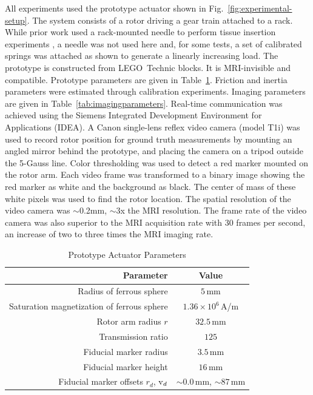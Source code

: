 \documentclass[journal]{IEEEtran}
\begin{document}
All experiments used the prototype actuator shown in Fig.\ \ref{fig:experimental-setup}. The system consists of a rotor driving a gear train attached to a rack. While prior work used a rack-mounted needle to perform tissue insertion experiments \cite{bergeles2012tracking}, a needle was not used here and, for some tests, a set of calibrated springs was attached as shown to generate a linearly increasing load. The prototype is constructed from LEGO\texttrademark~Technic blocks. It is MRI-invisible and compatible. Prototype parameters are given in Table\ \ref{tab:parameters}. 
Friction and inertia parameters were estimated through calibration experiments.
Imaging parameters are given in Table\ \ref{tab:imagingparameters}. 
Real-time communication was achieved using the Siemens Integrated Development Environment for Applications (IDEA). A Canon single-lens reflex video camera (model T1i) was used to record rotor position for ground truth measurements by mounting an angled mirror behind the prototype, and placing the camera on a tripod outside the 5-Gauss line. Color thresholding was used to detect a red marker mounted on the rotor arm. Each video frame was transformed to a binary image showing the red marker as white and the background as black.  The center of mass of these white pixels was used to find the rotor location. The spatial resolution of the video camera was $\sim$0.2mm, $\sim$3x the MRI resolution. The frame rate of the video camera was also superior to the MRI acquisition rate with 30 frames per second, an increase of two to three times the MRI imaging rate.

\begin{table}[b]
\vspace{-10pt}
\centering
\scriptsize
\caption{Prototype Actuator Parameters}
\label{tab:parameters}
\begin{tabular}{r | c}
	\textbf{Parameter}  & \textbf{Value} \\
	\hline
	Radius of ferrous sphere & $5\,$mm \\
	Saturation magnetization of ferrous sphere & $1.36\times10^6\,$A/m \\
	Rotor arm radius $r$& $32.5\,$mm \\
	Transmission ratio & $125$ \\
	Fiducial marker radius & $3.5\,$mm \\
	Fiducial marker height & $16\,$mm \\
	Fiducial marker offsets $r_d$, $\textnormal{v}_d$ & $ \sim0.0\,$mm, $\sim87\,$mm 
\end{tabular}
\normalsize
\end{table}
\end{document}
